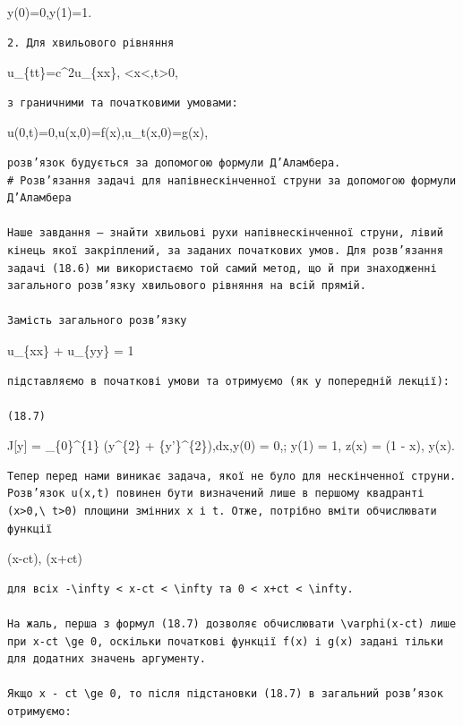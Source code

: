 \documentclass[
  ukrainian,
]{article}
\begin{document}
y(0)=0,\quad y(1)=1.

\begin{verbatim}
2. Для хвильового рівняння
\end{verbatim}

u\_\{tt\}=c\^{}2u\_\{xx\},
\textless x\textless{}\infty,\quad t\textgreater0,

\begin{verbatim}
з граничними та початковими умовами:
\end{verbatim}

u(0,t)=0,\quad u(x,0)=f(x),\quad u\_t(x,0)=g(x),

\begin{verbatim}
розв’язок будується за допомогою формули Д’Аламбера.
# Розв’язання задачі для напівнескінченної струни за допомогою формули Д’Аламбера

Наше завдання — знайти хвильові рухи напівнескінченної струни, лівий кінець якої закріплений, за заданих початкових умов. Для розв’язання задачі (18.6) ми використаємо той самий метод, що й при знаходженні загального розв’язку хвильового рівняння на всій прямій.

Замість загального розв’язку
\end{verbatim}

u\_\{xx\} + u\_\{yy\} = 1

\begin{verbatim}
підставляємо в початкові умови та отримуємо (як у попередній лекції):

(18.7)
\end{verbatim}

J{[}y{]} = \int\_\{0\}\^{}\{1\} (y\^{}\{2\} +
\{y'\}\^{}\{2\}),dx,\quad y(0) = 0,; y(1) = 1, z(x) = (1 - x), y(x).

\begin{verbatim}
Тепер перед нами виникає задача, якої не було для нескінченної струни. Розв’язок u(x,t) повинен бути визначений лише в першому квадранті (x>0,\ t>0) площини змінних x і t. Отже, потрібно вміти обчислювати функції
\end{verbatim}

\varphi(x-ct), \quad \psi(x+ct)

\begin{verbatim}
для всіх -\infty < x-ct < \infty та 0 < x+ct < \infty.

На жаль, перша з формул (18.7) дозволяє обчислювати \varphi(x-ct) лише при x-ct \ge 0, оскільки початкові функції f(x) і g(x) задані тільки для додатних значень аргументу.

Якщо x - ct \ge 0, то після підстановки (18.7) в загальний розв’язок отримуємо:
\end{verbatim}
\end{document}
